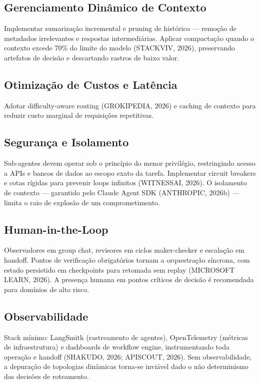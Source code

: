 \documentclass[12pt,a4paper]{article}
\begin{document}
\subsection{Gerenciamento Dinâmico de Contexto}
Implementar sumarização incremental e pruning de histórico — remoção de metadados irrelevantes e respostas intermediárias. Aplicar compactação quando o contexto excede 70\% do limite do modelo (STACKVIV, 2026), preservando artefatos de decisão e descartando rastros de baixo valor.

\subsection{Otimização de Custos e Latência}
Adotar difficulty-aware routing (GROKIPEDIA, 2026) e caching de contexto para reduzir custo marginal de requisições repetitivas.

\subsection{Segurança e Isolamento}
Sub-agentes devem operar sob o princípio do menor privilégio, restringindo acesso a APIs e bancos de dados ao escopo exato da tarefa. Implementar circuit breakers e cotas rígidas para prevenir loops infinitos (WITNESSAI, 2026). O isolamento de contexto — garantido pelo Claude Agent SDK (ANTHROPIC, 2026b) — limita o raio de explosão de um comprometimento.

\subsection{Human-in-the-Loop}
Observadores em group chat, revisores em ciclos maker-checker e escalação em handoff. Pontos de verificação obrigatórios tornam a orquestração síncrona, com estado persistido em checkpoints para retomada sem replay (MICROSOFT LEARN, 2026). A presença humana em pontos críticos de decisão é recomendada para domínios de alto risco.

\subsection{Observabilidade}
Stack mínimo: LangSmith (rastreamento de agentes), OpenTelemetry (métricas de infraestrutura) e dashboards de workflow engine, instrumentando toda operação e handoff (SHAKUDO, 2026; APISCOUT, 2026). Sem observabilidade, a depuração de topologias dinâmicas torna-se inviável dado o não determinismo das decisões de roteamento.
\end{document}
